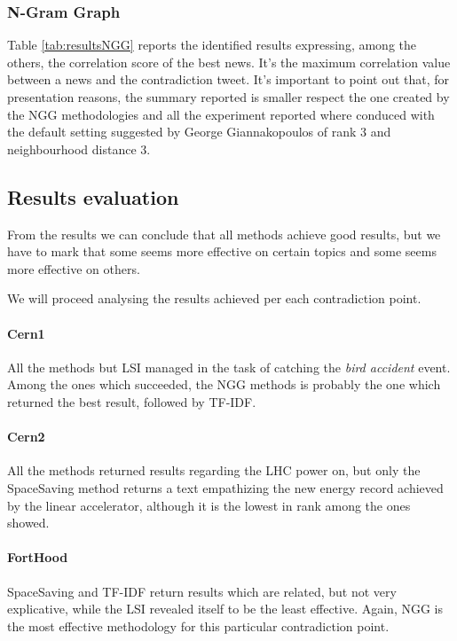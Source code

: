 \subsubsection*{N-Gram Graph}
Table \ref{tab:resultsNGG} reports the identified results expressing, among the others, the correlation score of the best news. It's the maximum correlation value between a news and the contradiction tweet.
It's important to point out that, for presentation reasons, the summary reported is smaller respect the one created by the NGG methodologies and all the experiment reported where conduced with the default setting suggested by George Giannakopoulos of rank 3 and neighbourhood distance 3.









\subsection*{Results evaluation}
From the results we can conclude that all methods achieve good results,
but we have to mark that some seems more effective on certain topics and some
seems more effective on others.

We will proceed analysing the results achieved per each contradiction point.

\paragraph*{Cern1}
All the methods but LSI managed in the task of catching the \emph{bird accident}
event. Among the ones which succeeded, the NGG methods is probably the one which
returned the best result, followed by TF-IDF.

\paragraph*{Cern2}
All the methods returned results regarding the LHC power on, but only the
SpaceSaving method returns a text empathizing the new energy record achieved by the
linear accelerator, although it is the lowest in rank among the ones showed.

\paragraph*{FortHood}
SpaceSaving and TF-IDF return results which are related, but not very
explicative, while the LSI revealed itself to be the least effective. Again, NGG
is the most effective methodology for this particular contradiction point.


